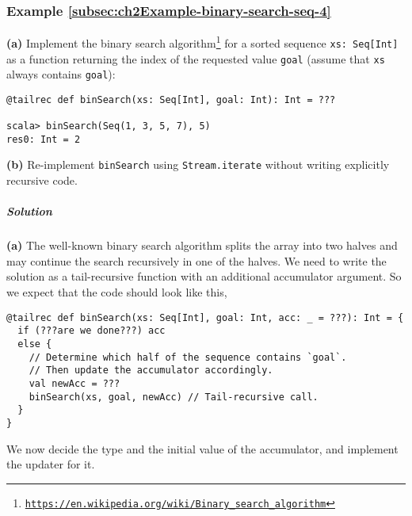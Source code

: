 \subsubsection{Example \label{subsec:ch2Example-binary-search-seq-4}\ref{subsec:ch2Example-binary-search-seq-4}}

\textbf{(a)} Implement the binary search algorithm\footnote{\texttt{\href{https://en.wikipedia.org/wiki/Binary_search_algorithm}{https://en.wikipedia.org/wiki/Binary\_search\_algorithm}}}
for a sorted sequence \lstinline!xs: Seq[Int]! as a function returning
the index of the requested value \lstinline!goal! (assume that \lstinline!xs!
always contains \lstinline!goal!):
\begin{lstlisting}
@tailrec def binSearch(xs: Seq[Int], goal: Int): Int = ???

scala> binSearch(Seq(1, 3, 5, 7), 5)
res0: Int = 2
\end{lstlisting}

\textbf{(b)} Re-implement \lstinline!binSearch! using \lstinline!Stream.iterate!
without writing explicitly recursive code.

\subparagraph{Solution}

\textbf{(a)} The well-known binary search algorithm splits the array
into two halves and may continue the search recursively in one of
the halves. We need to write the solution as a tail-recursive function
with an additional accumulator argument. So we expect that the code
should look like this,
\begin{lstlisting}
@tailrec def binSearch(xs: Seq[Int], goal: Int, acc: _ = ???): Int = {
  if (???are we done???) acc
  else {
    // Determine which half of the sequence contains `goal`.
    // Then update the accumulator accordingly.
    val newAcc = ???
    binSearch(xs, goal, newAcc) // Tail-recursive call.
  }
}
\end{lstlisting}
We now decide the type and the initial value of the accumulator, and
implement the updater for it.

